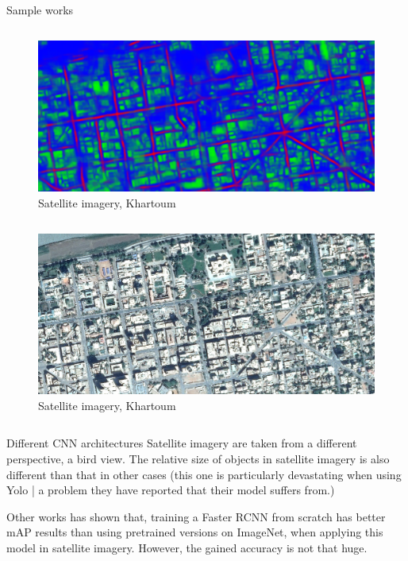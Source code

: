 \documentclass{beamer}
\begin{document}
\begin{frame}{Sample works}
  
  \begin{columns}
  \begin{figure}
   \includegraphics[width=0.9\linewidth]{images/sat-img-khartoum}
    \tiny{\caption{Satellite imagery, Khartoum}}
    \label{fig:sat-img-khartoum-1}
  \end{figure}
\end{columns}

\begin{columns}
  \begin{figure}
    \includegraphics[width=.9\linewidth]{images/khartoum-sat-un}
    \tiny{\caption{Satellite imagery, Khartoum}}
    \label{fig:sat-img-khartoum-2}
  \end{figure}
\end{columns}

\end{frame}
\begin{frame}{Different CNN architectures }
  Satellite imagery are taken from a different perspective, a bird view. The
  relative size of objects in satellite imagery is also different than that in
  other cases (this one is particularly devastating when using Yolo | a problem
  they have reported that their model suffers from.)

  Other works has shown that, training a Faster RCNN from scratch has better mAP
  results than using pretrained versions on ImageNet, when applying this model
  in satellite imagery. However, the gained accuracy is not that huge.


\end{frame}
\end{document}
